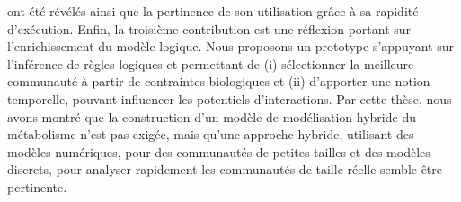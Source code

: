 \documentclass[../main.tex]{subfiles}
\begin{document}
ont été révélés ainsi que la pertinence de son utilisation grâce à sa rapidité d'exécution. Enfin, la troisième contribution est une réflexion portant sur l'enrichissement du modèle logique.  Nous proposons un prototype s'appuyant sur l'inférence de règles logiques et permettant de (i) sélectionner la meilleure communauté à partir de contraintes biologiques et (ii) d'apporter une notion temporelle, pouvant influencer les potentiels d'interactions. Par cette thèse, nous avons montré que la construction d’un modèle de modélisation hybride du métabolisme n’est pas exigée, mais qu’une approche hybride, utilisant des modèles numériques, pour des communautés de petites tailles et des modèles discrets, pour analyser rapidement les communautés de taille réelle semble être pertinente. 
\end{document}
